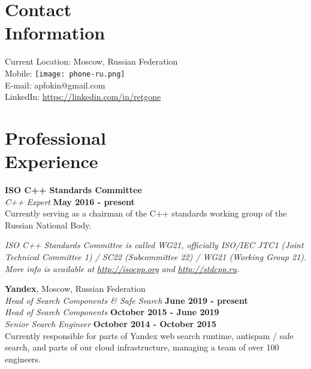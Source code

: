 \documentclass[margin,line]{CV}
\begin{document}
\begin{resume}


    \section{\mysidestyle Contact\\Information}
    Current Location: Moscow, Russian Federation \\
    Mobile: \texttt{[image: phone-ru.png]} \\ 
    E-mail: apfokin@gmail.com \\
    LinkedIn: \url{https://linkedin.com/in/retgone}

    \section{\mysidestyle Professional\\Experience}
    \textbf{ISO C++ Standards Committee} \vspace{2mm}\\\vspace{1mm}%
    \textsl{C++ Expert} \hfill \textbf{May 2016 - present}\\\vspace{1mm}%
    Currently serving as a chairman of the C++ standards working group of the Russian National Body.

\ifdefined\superofficial
    {\footnotesize\textit{ISO C++ Standards Committee is called WG21, officially ISO/IEC JTC1 (Joint Technical Committee 1) / SC22 (Subcommittee 22) / WG21 (Working Group 21). More info is available at \url{http://isocpp.org} and \url{http://stdcpp.ru}.}}
\fi
    
    \textbf{Yandex}, Moscow, Russian Federation \vspace{2mm}\\\vspace{1mm}%
    \textsl{Head of Search Components \& Safe Search} \hfill \textbf{June 2019 - present}\\\vspace{1mm}%
    \textsl{Head of Search Components} \hfill \textbf{October 2015 - June 2019}\\\vspace{1mm}%
    \textsl{Senior Search Engineer} \hfill \textbf{October 2014 - October 2015}\\
    Currently responsible for parts of Yandex web search runtime, antispam / safe search, and parts of our cloud infrastructure, managing a team of over 100 engineers.
    

\end{resume}
\end{document}
